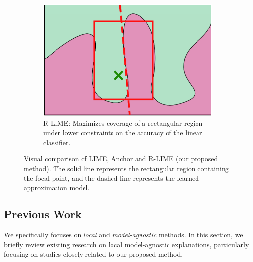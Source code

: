 \documentclass[11pt]{article}
\begin{document}
\begin{figure}[tbp]
	\hspace{0.03\textwidth}
	\begin{subfigure}[t]{0.3\textwidth}
		\centering
		\includegraphics[width=\textwidth]{visual-rlime3}
		\caption{%
			R-LIME:
			Maximizes coverage of a rectangular region
			under lower constraints on the accuracy of the linear classifier.
		}\label{fig:rlime}
	\end{subfigure}
	\caption[Visual comparison of LIME, Anchor and R-LIME]{%
		Visual comparison of LIME, Anchor and R-LIME (our proposed method).
		The solid line represents the rectangular region containing the focal
		point, and the dashed line represents the learned approximation model.
	}
\end{figure}
\subsection{Previous Work}
We specifically focuses on \emph{local} and \emph{model-agnostic} methods.
In this section,
we briefly review existing research on local model-agnostic explanations,
particularly focusing on studies closely related to our proposed method.
\end{document}
